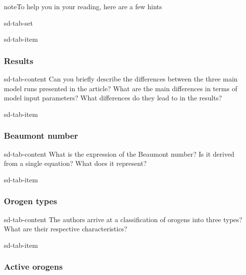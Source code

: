 \documentclass[letterpaper,10pt,english]{jupyterBook}
\begin{document}
\begin{sphinxadmonition}{note}{To help you in your reading, here are a few hints}

\begin{sphinxuseclass}{sd-tab-set}
\begin{sphinxuseclass}{sd-tab-item}\subsubsection*{Results}

\begin{sphinxuseclass}{sd-tab-content}
\sphinxAtStartPar
Can you briefly describe the differences between the three main model runs presented in the article? What are the main differences in terms of model input parameters? What differences do they lead to in the results?

\end{sphinxuseclass}
\end{sphinxuseclass}
\begin{sphinxuseclass}{sd-tab-item}\subsubsection*{Beaumont number}

\begin{sphinxuseclass}{sd-tab-content}
\sphinxAtStartPar
What is the expression of the Beaumont number? Is it derived from a single equation? What does it represent?

\end{sphinxuseclass}
\end{sphinxuseclass}
\begin{sphinxuseclass}{sd-tab-item}\subsubsection*{Orogen types}

\begin{sphinxuseclass}{sd-tab-content}
\sphinxAtStartPar
The authors arrive at a classification of orogens into three types? What are their respective characteristics?

\end{sphinxuseclass}
\end{sphinxuseclass}
\begin{sphinxuseclass}{sd-tab-item}\subsubsection*{Active orogens}


\end{sphinxuseclass}
\end{sphinxuseclass}
\end{sphinxadmonition}
\end{document}
